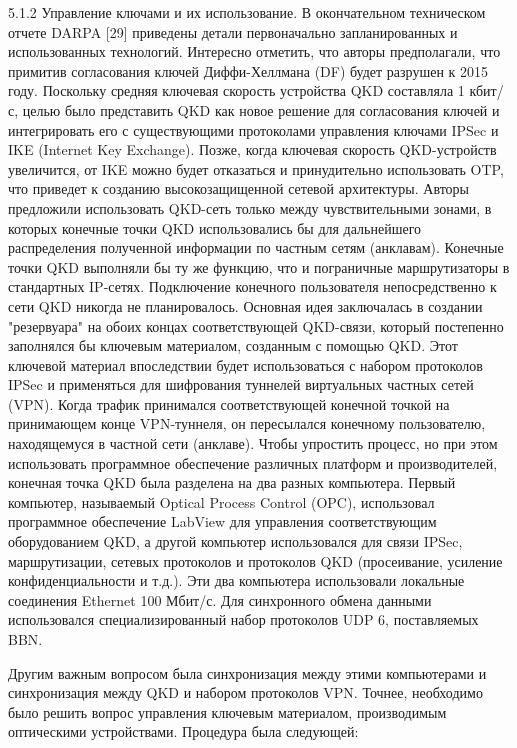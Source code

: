 5.1.2 Управление ключами и их использование. В окончательном техническом отчете DARPA [29] приведены детали первоначально запланированных и использованных технологий. Интересно отметить, что авторы предполагали, что примитив согласования ключей Диффи-Хеллмана (DF) будет разрушен к 2015 году. Поскольку средняя ключевая скорость устройства QKD составляла 1 кбит/с, целью было представить QKD как новое решение для согласования ключей и интегрировать его с существующими протоколами управления ключами IPSec и IKE (Internet Key Exchange). Позже, когда ключевая скорость QKD-устройств увеличится, от IKE можно будет отказаться и принудительно использовать OTP, что приведет к созданию высокозащищенной сетевой архитектуры.
Авторы предложили использовать QKD-сеть только между чувствительными зонами, в которых конечные точки QKD использовались бы для дальнейшего распределения полученной информации по частным сетям (анклавам). Конечные точки QKD выполняли бы ту же функцию, что и пограничные маршрутизаторы в стандартных IP-сетях. Подключение конечного пользователя непосредственно к сети QKD никогда не планировалось. Основная идея заключалась в создании "резервуара" на обоих концах соответствующей QKD-связи, который постепенно заполнялся бы ключевым материалом, созданным с помощью QKD. Этот ключевой материал впоследствии будет использоваться с набором протоколов IPSec и применяться для шифрования туннелей виртуальных частных сетей (VPN).
Когда трафик принимался соответствующей конечной точкой на принимающем конце VPN-туннеля, он пересылался конечному пользователю, находящемуся в частной сети (анклаве).
Чтобы упростить процесс, но при этом использовать программное обеспечение различных платформ и производителей, конечная точка QKD была разделена на два разных компьютера. Первый компьютер, называемый Optical Process Control (OPC), использовал программное обеспечение LabView для управления соответствующим оборудованием QKD, а другой компьютер использовался для связи IPSec, маршрутизации, сетевых протоколов и протоколов QKD (просеивание, усиление конфиденциальности и т.д.). Эти два компьютера использовали локальные соединения Ethernet 100 Мбит/с. Для синхронного обмена данными использовался специализированный набор протоколов UDP 6, поставляемых BBN.

Другим важным вопросом была синхронизация между этими компьютерами и синхронизация между QKD и набором протоколов VPN. Точнее, необходимо было решить вопрос управления ключевым материалом, производимым оптическими устройствами. Процедура была следующей:

